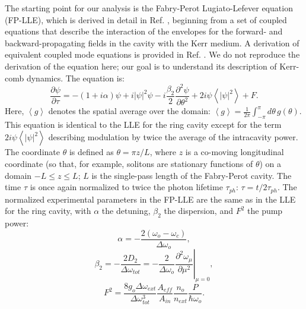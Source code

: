 The starting point for our analysis is the Fabry-Perot Lugiato-Lefever equation (FP-LLE), which is derived in detail in Ref. , beginning from a set of coupled equations that describe the interaction of the envelopes for the forward- and backward-propagating fields in the cavity with the Kerr medium. A derivation of equivalent coupled mode equations is provided in Ref. . We do not reproduce the derivation of the equation here; our goal is to understand its description of Kerr-comb dynamics. The equation is:
\begin{equation}
\frac{\partial\psi}{\partial\tau}=-(1+i\alpha)\psi+i|\psi|^2\psi-i\frac{\beta_2}{2}\frac{\partial^2\psi}{\partial\theta^2}+2i\psi\left<|\psi|^2\right>+F\label{eq:FPLLE}.
\end{equation}
Here, $\left<g\right>$ denotes the spatial average over the domain: $\left<g\right>=\frac{1}{2\pi}\int_{-\pi}^{\pi}d\theta\,g(\theta)$. This equation is identical to the LLE for the ring cavity except for the term $2i\psi\left<|\psi|^2\right>$ describing modulation by twice the average of the intracavity power. The coordinate $\theta$ is defined as $\theta=\pi z/L$, where $z$ is a co-moving longitudinal coordinate (so that, for example, solitons are stationary functions of $\theta$) on a domain $-L\leq z\leq L$; $L$ is the single-pass length of the Fabry-Perot cavity. The time $\tau$ is once again normalized to twice the photon lifetime $\tau_{ph}$: $\tau=t/2\tau_{ph}$. The normalized experimental parameters in the FP-LLE are the same as in the LLE for the ring cavity, with $\alpha$ the detuning, $\beta_2$ the dispersion, and $F^2$ the pump power:
\begin{equation}
\alpha=-\frac{2(\omega_o-\omega_c)}{\Delta\omega_o},
\end{equation}
\begin{equation}
\beta_2=\left.-\frac{2D_2}{\Delta\omega_{tot}}=-\frac{2}{\Delta\omega_o}\frac{\partial^2\omega_\mu}{\partial \mu^2}\right|_{\mu=0}, \label{betaLLE}
\end{equation}
\begin{equation}
F^2=\frac{8g_o\Delta\omega_{ext}}{\Delta\omega_{tot}^3}\frac{A_{eff}}{A_{in}}\frac{n_o}{n_{ext}}\frac{P}{\hbar\omega_o}.
\end{equation}
